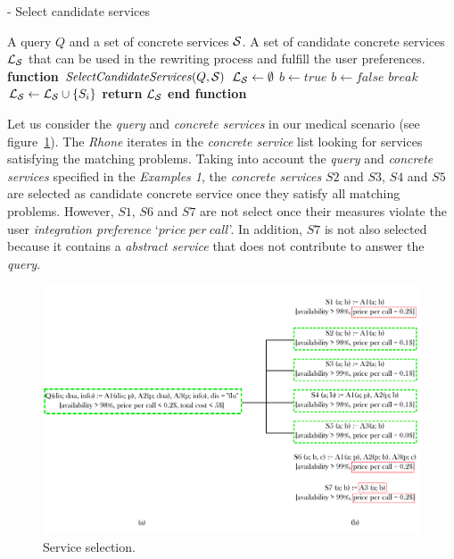 \begin{algorithm}
\caption{ - Select candidate services}
\label{selectingservices}
\begin{algorithmic}[1]
\REQUIRE A query $Q$ and a set of concrete services $\hbox{${\cal S}$}$.
\ENSURE A set of candidate concrete services $\hbox{${\cal L_{S}}$}$ that can be used in the rewriting process and fulfill the user preferences.
\STATE \textbf{function} $\mathit{SelectCandidateServices} (Q, \hbox{${\cal S}$})$
\STATE $\hbox{${\cal L_{S}}$} \leftarrow \emptyset$
		\STATE $b \leftarrow \mathit{true}$		
				\STATE $b \leftarrow \mathit{false}$	
				\STATE $\mathit{break}$
			\ENDIF
		\ENDFOR
			\STATE $\hbox{${\cal L_{S}}$} \leftarrow \hbox{${\cal L_{S}}$} \cup \lbrace S_{i} \rbrace$	
		\ENDIF
	\ENDIF
\ENDFOR
\STATE \textbf{return} $\hbox{${\cal L_{S}}$}$
\STATE \textbf{end function}
\end{algorithmic}
\end{algorithm}

Let us consider the \textit{query} and \textit{concrete services} in our medical scenario (see figure~\ref{fig:queryandservices-selecting}).
The \textit{Rhone} iterates in the \textit{concrete service} list looking for services satisfying the matching problems.
Taking into account the \textit{query} and \textit{concrete services} specified in the \textit{Examples 1}, the \textit{concrete services} $S2$ and $S3$, $S4$ and $S5$ are selected as candidate concrete service once they satisfy all matching problems. However, $S1$, $S6$ and $S7$ are not select once their measures violate the user \textit{integration preference} `$price \ per \ call$'. In addition, $S7$ is not also selected because it contains a \textit{abstract service} that does not contribute to answer the \textit{query}.
\begin{figure}[h!]
\center
\includegraphics[scale=0.57]{query-and-services-selecting.pdf}
\caption{Service selection.}\label{fig:queryandservices-selecting}
\end{figure}

